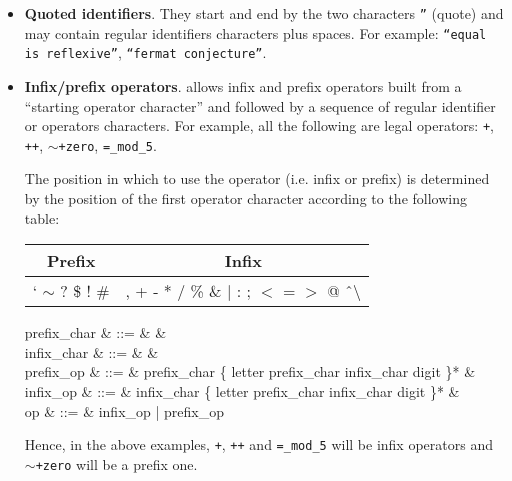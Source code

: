 \begin{itemize}
  \item {\bf Quoted identifiers}.
    They start and end by the two characters {\tt ''} (quote) and may
    contain regular identifiers characters plus spaces. For example:
    {\tt ``equal is reflexive''}, {\tt ``fermat conjecture''}.
  \item {\bf Infix/prefix operators}.
    \focal allows infix and prefix operators built from a
    ``starting operator character'' and followed by a sequence of
    regular identifier or operators characters. For example, all the
    following are legal operators: 
    {\tt +}, {\tt ++}, {\tt $\sim$+zero}, {\tt =\_mod\_5}.

    The position in which to use the operator (i.e. infix or prefix)
    is determined by the position of the first operator character
    according to the following table:
    \begin{center}
    \begin{tabular}{|c|c|}
    \hline
    Prefix & Infix \\
    \hline
    ` $\sim$ ? \$ ! \#                            &
    , + - * / \% \& $|$ : ; $<$ = $>$ @ \^\ $\setminus$ \\
    \hline
    \end{tabular}
    \end{center}

    \begin{syntax}
    prefix\_char & ::= & & \\
    infix\_char & ::= &
         & \\
    prefix\_op & ::= & prefix\_char
        \{ letter \mid prefix\_char \mid infix\_char
        \mid digit \mid \terminal{\_} \}* & \\
    infix\_op & ::= & infix\_char
        \{ letter \mid prefix\_char \mid infix\_char
        \mid digit \mid \terminal{\_} \}* & \\
    op & ::= & infix\_op | prefix\_op
    \end{syntax}

    Hence, in the above examples, {\tt +}, {\tt ++} and
    {\tt =\_mod\_5} will be infix operators and {\tt $\sim$+zero} will
    be a prefix one.


\end{itemize}

